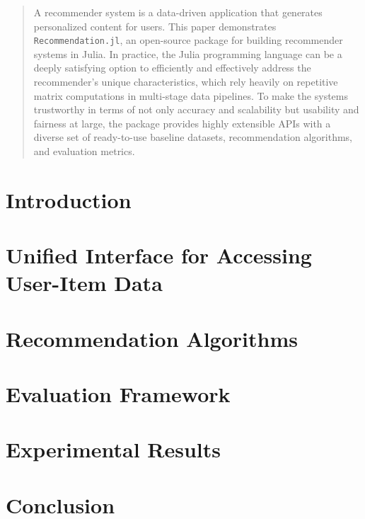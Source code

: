 \documentclass{juliacon}
\begin{document}


\maketitle

\begin{abstract}
A recommender system is a data-driven application that generates personalized content for users. This paper demonstrates \texttt{Recommendation.jl}, an open-source package for building recommender systems in Julia. In practice, the Julia programming language can be a deeply satisfying option to efficiently and effectively address the recommender's unique characteristics, which rely heavily on repetitive matrix computations in multi-stage data pipelines. To make the systems trustworthy in terms of not only accuracy and scalability but usability and fairness at large, the package provides highly extensible APIs with a diverse set of ready-to-use baseline datasets, recommendation algorithms, and evaluation metrics.
\end{abstract}

\section{Introduction}


\section{Unified Interface for Accessing User-Item Data}
\label{sec:data}


\section{Recommendation Algorithms}
\label{sec:algorithm}


\section{Evaluation Framework}
\label{sec:evaluation}


\section{Experimental Results}
\label{sec:experiment}

\section{Conclusion}


\end{document}

